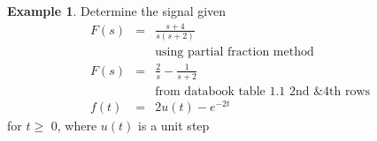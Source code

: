 \documentclass[11pt]{article} %
\theoremstyle{definition}
\newtheorem{example}{Example}[subsection]
\begin{document}
\begin{example}
	Determine the signal given
		\begin{eqnarray}
			F(s) &=& \frac{s+4}{s(s+2)} \nonumber \\
			&&\mbox{using partial fraction method} \nonumber \\
			F(s) &=& \frac{2}{s} - \frac{1}{s+2} \nonumber \\
			&&\mbox{from databook table 1.1 2nd \& 4th rows} \nonumber \\
			f(t)&=&2u(t)-e^{-2t}
		\end{eqnarray}
		for $t\ge$ 0, where $u(t)$ is a unit step

	\begin{figure}[h]
		\centering
		\caption{}
	\end{figure}
\end{example}
\end{document}
